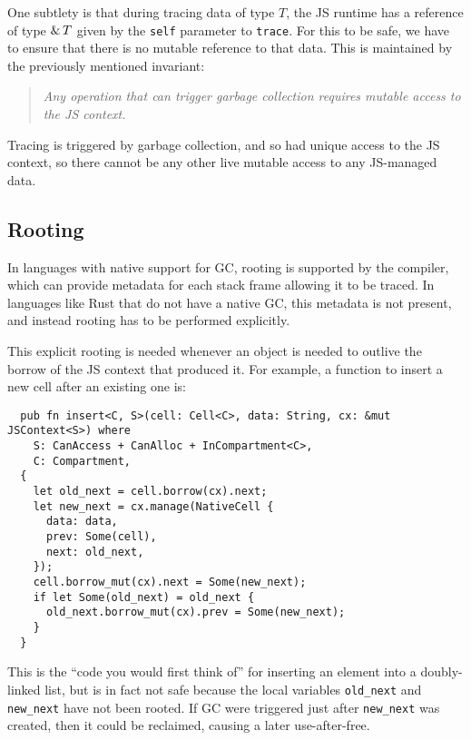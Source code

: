 One subtlety is that during tracing data of type $T$, the JS runtime
has a reference of type $\&\,{T}$ given by the \verb|self| parameter
to \verb|trace|. For this to be safe, we have to ensure that there is
no mutable reference to that data. This is maintained by the
previously mentioned invariant:
\begin{quote}\em
  Any operation that can trigger garbage collection
  requires mutable access to the JS context.
\end{quote}
Tracing is triggered by garbage collection, and so had unique access
to the JS context, so there cannot be any other live mutable access
to any JS-managed data.

\subsection{Rooting}
\label{sec:rooting}

In languages with native support for GC, rooting is
supported by the compiler, which can provide metadata for
each stack frame allowing it to be traced. In languages like
Rust that do not have a native GC, this metadata is not
present, and instead rooting has to be performed explicitly.

This explicit rooting is needed whenever an object is
needed to outlive the borrow of the JS context that produced
it. For example, a function to insert a new cell after
an existing one is:
\begin{verbatim}
  pub fn insert<C, S>(cell: Cell<C>, data: String, cx: &mut JSContext<S>) where
    S: CanAccess + CanAlloc + InCompartment<C>,
    C: Compartment,
  {
    let old_next = cell.borrow(cx).next;
    let new_next = cx.manage(NativeCell {
      data: data,
      prev: Some(cell),
      next: old_next,
    });
    cell.borrow_mut(cx).next = Some(new_next);
    if let Some(old_next) = old_next {
      old_next.borrow_mut(cx).prev = Some(new_next);
    }
  }
\end{verbatim}
This is the ``code you would first think of'' for inserting an
element into a doubly-linked list, but is in fact not safe because
the local variables \verb|old_next| and \verb|new_next| have not been
rooted. If GC were triggered just after \verb|new_next| was created,
then it could be reclaimed, causing a later use-after-free.

